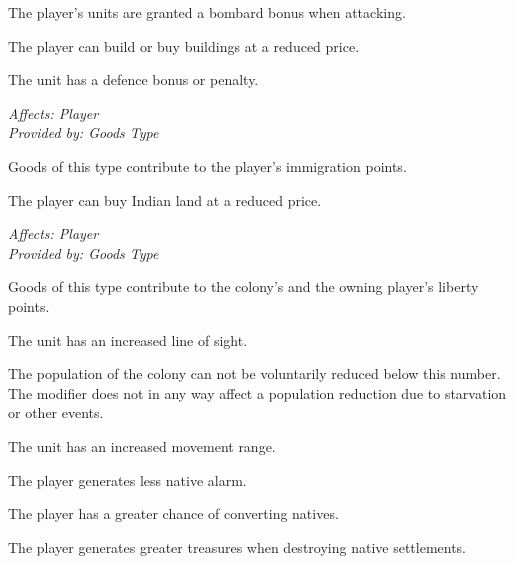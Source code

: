 \documentclass[12pt]{book}
\begin{document}
\affectsPlayer

The player's units are granted a bombard bonus when attacking.

\affectsPlayer

The player can build or buy buildings at a reduced price.

\affectsUnit

The unit has a defence bonus or penalty.

\textit{Affects: Player\\Provided by: Goods Type}

Goods of this type contribute to the player's immigration points.

\affectsPlayer

The player can buy Indian land at a reduced price.

\textit{Affects: Player\\Provided by: Goods Type}

Goods of this type contribute to the colony's and the owning player's
liberty points.

\affectsUnit

The unit has an increased line of sight.

\affectsColonyTwo

The population of the colony can not be voluntarily reduced below this
number. The modifier does not in any way affect a population reduction
due to starvation or other events.

\affectsUnit

The unit has an increased movement range.

\affectsPlayer

The player generates less native alarm.

\affectsPlayer

The player has a greater chance of converting natives.

\affectsPlayer

The player generates greater treasures when destroying native settlements.
\end{document}

